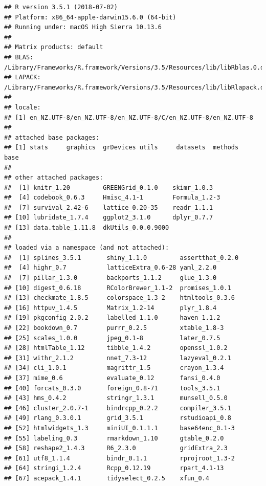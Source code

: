 \documentclass[]{article}
\begin{document}
\begin{verbatim}
## R version 3.5.1 (2018-07-02)
## Platform: x86_64-apple-darwin15.6.0 (64-bit)
## Running under: macOS High Sierra 10.13.6
## 
## Matrix products: default
## BLAS: /Library/Frameworks/R.framework/Versions/3.5/Resources/lib/libRblas.0.dylib
## LAPACK: /Library/Frameworks/R.framework/Versions/3.5/Resources/lib/libRlapack.dylib
## 
## locale:
## [1] en_NZ.UTF-8/en_NZ.UTF-8/en_NZ.UTF-8/C/en_NZ.UTF-8/en_NZ.UTF-8
## 
## attached base packages:
## [1] stats     graphics  grDevices utils     datasets  methods   base     
## 
## other attached packages:
##  [1] knitr_1.20         GREENGrid_0.1.0    skimr_1.0.3       
##  [4] codebook_0.6.3     Hmisc_4.1-1        Formula_1.2-3     
##  [7] survival_2.42-6    lattice_0.20-35    readr_1.1.1       
## [10] lubridate_1.7.4    ggplot2_3.1.0      dplyr_0.7.7       
## [13] data.table_1.11.8  dkUtils_0.0.0.9000
## 
## loaded via a namespace (and not attached):
##  [1] splines_3.5.1       shiny_1.1.0         assertthat_0.2.0   
##  [4] highr_0.7           latticeExtra_0.6-28 yaml_2.2.0         
##  [7] pillar_1.3.0        backports_1.1.2     glue_1.3.0         
## [10] digest_0.6.18       RColorBrewer_1.1-2  promises_1.0.1     
## [13] checkmate_1.8.5     colorspace_1.3-2    htmltools_0.3.6    
## [16] httpuv_1.4.5        Matrix_1.2-14       plyr_1.8.4         
## [19] pkgconfig_2.0.2     labelled_1.1.0      haven_1.1.2        
## [22] bookdown_0.7        purrr_0.2.5         xtable_1.8-3       
## [25] scales_1.0.0        jpeg_0.1-8          later_0.7.5        
## [28] htmlTable_1.12      tibble_1.4.2        openssl_1.0.2      
## [31] withr_2.1.2         nnet_7.3-12         lazyeval_0.2.1     
## [34] cli_1.0.1           magrittr_1.5        crayon_1.3.4       
## [37] mime_0.6            evaluate_0.12       fansi_0.4.0        
## [40] forcats_0.3.0       foreign_0.8-71      tools_3.5.1        
## [43] hms_0.4.2           stringr_1.3.1       munsell_0.5.0      
## [46] cluster_2.0.7-1     bindrcpp_0.2.2      compiler_3.5.1     
## [49] rlang_0.3.0.1       grid_3.5.1          rstudioapi_0.8     
## [52] htmlwidgets_1.3     miniUI_0.1.1.1      base64enc_0.1-3    
## [55] labeling_0.3        rmarkdown_1.10      gtable_0.2.0       
## [58] reshape2_1.4.3      R6_2.3.0            gridExtra_2.3      
## [61] utf8_1.1.4          bindr_0.1.1         rprojroot_1.3-2    
## [64] stringi_1.2.4       Rcpp_0.12.19        rpart_4.1-13       
## [67] acepack_1.4.1       tidyselect_0.2.5    xfun_0.4
\end{verbatim}
\end{document}
